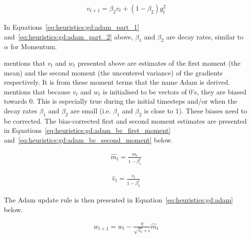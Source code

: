 \begin{equation}
      \label{eq:heuristics:gd:adam_part_2}
      \begin{split}
            v_{t+1} = \beta_{2}v_{t} + (1 - \beta_{2})g^{2}_{t}
      \end{split}
\end{equation}

In Equations~\ref{eq:heuristics:gd:adam_part_1} and~\ref{eq:heuristics:gd:adam_part_2} above, $\beta_{1}$ and $\beta_{2}$ are decay rates, similar to $\alpha$ for \ac{Momentum}.

\citeauthor{ref:ruder:2016} \cite{ref:ruder:2016} mentions that $v_{t}$ and $w_{t}$ presented above are estimates of the first moment (the mean) and the second moment (the uncentered variance) of the gradients respectively. It is from these moment terms that the name \acl{Adam} is derived. \citeauthor{ref:kingma:2014} \cite{ref:kingma:2014} mentions that because $v_{t}$ and $w_{t}$ is initialised to be vectors of 0's, they are biased towards 0. This is especially true during the initial timesteps and/or when the decay rates $\beta_{1}$ and $\beta_{2}$ are small (i.e. $\beta_{1}$ and $\beta_{2}$ is close to 1). These biases need to be corrected. The bias-corrected first and second moment estimates are presented in Equations~\ref{eq:heuristics:gd:adam_bc_first_moment} and~\ref{eq:heuristics:gd:adam_bc_second_moment} below.

\begin{equation}
      \label{eq:heuristics:gd:adam_bc_first_moment}
      \begin{split}
            \hat{m}_{t} = \frac{m_{t}}{1 - \beta^{t}_{1}}
      \end{split}
\end{equation}


\begin{equation}
      \label{eq:heuristics:gd:adam_bc_second_moment}
      \begin{split}
            \hat{v}_{t} = \frac{v_{t}}{1 - \beta^{t}_{2}}
      \end{split}
\end{equation}

The \ac{Adam} update rule is then presented in Equation~\ref{eq:heuristics:gd:adam} below.

\begin{equation}
      \label{eq:heuristics:gd:adam}
      \begin{split}
            w_{t+1} = w_{t} - \frac{\eta}{\sqrt{\hat{v}_{t}} + \epsilon}\hat{m}_{t}
      \end{split}
\end{equation}


